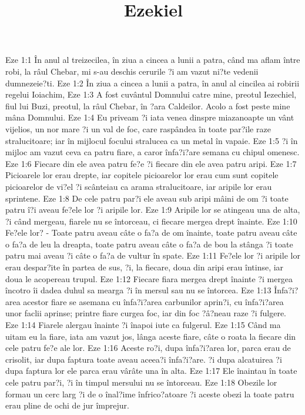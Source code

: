 

\title{Ezekiel}

Eze 1:1  În anul al treizecilea, în ziua a cincea a lunii a patra, când ma aflam între robi, la râul Chebar, mi s-au deschis cerurile ?i am vazut ni?te vedenii dumnezeie?ti.
Eze 1:2  În ziua a cincea a lunii a patra, în anul al cincilea ai robirii regelui Ioiachim,
Eze 1:3  A fost cuvântul Domnului catre mine, preotul Iezechiel, fiul lui Buzi, preotul, la râul Chebar, în ?ara Caldeilor. Acolo a fost peste mine mâna Domnului.
Eze 1:4  Eu priveam ?i iata venea dinspre miazanoapte un vânt vijelios, un nor mare ?i un val de foc, care raspândea în toate par?ile raze stralucitoare; iar în mijlocul focului stralucea ca un metal în vapaie.
Eze 1:5  ?i în mijloc am vazut ceva ca patru fiare, a caror înfa?i?are semana cu chipul omenesc.
Eze 1:6  Fiecare din ele avea patru fe?e ?i fiecare din ele avea patru aripi.
Eze 1:7  Picioarele lor erau drepte, iar copitele picioarelor lor erau cum sunt copitele picioarelor de vi?el ?i scânteiau ca arama stralucitoare, iar aripile lor erau sprintene.
Eze 1:8  De cele patru par?i ele aveau sub aripi mâini de om ?i toate patru î?i aveau fe?ele lor ?i aripile lor.
Eze 1:9  Aripile lor se atingeau una de alta, ?i când mergeau, fiarele nu se întorceau, ci fiecare mergea drept înainte.
Eze 1:10  Fe?ele lor? - Toate patru aveau câte o fa?a de om înainte, toate patru aveau câte o fa?a de leu la dreapta, toate patru aveau câte o fa?a de bou la stânga ?i toate patru mai aveau ?i câte o fa?a de vultur în spate.
Eze 1:11  Fe?ele lor ?i aripile lor erau despar?ite în partea de sus, ?i, la fiecare, doua din aripi erau întinse, iar doua le acopereau trupul.
Eze 1:12  Fiecare fiara mergea drept înainte ?i mergea încotro îi dadea duhul sa mearga ?i în mersul sau nu se întorcea.
Eze 1:13  Înfa?i?area acestor fiare se asemana cu înfa?i?area carbunilor aprin?i, cu înfa?i?area unor faclii aprinse; printre fiare curgea foc, iar din foc ?â?neau raze ?i fulgere.
Eze 1:14  Fiarele alergau înainte ?i înapoi iute ca fulgerul.
Eze 1:15  Când ma uitam eu la fiare, iata am vazut jos, lânga aceste fiare, câte o roata la fiecare din cele patru fe?e ale lor.
Eze 1:16  Aceste ro?i, dupa înfa?i?area lor, parca erau de crisolit, iar dupa faptura toate aveau aceea?i înfa?i?are. ?i dupa alcatuirea ?i dupa faptura lor ele parca erau vârâte una în alta.
Eze 1:17  Ele înaintau în toate cele patru par?i, ?i în timpul mersului nu se întorceau.
Eze 1:18  Obezile lor formau un cerc larg ?i de o înal?ime înfrico?atoare ?i aceste obezi la toate patru erau pline de ochi de jur împrejur.
